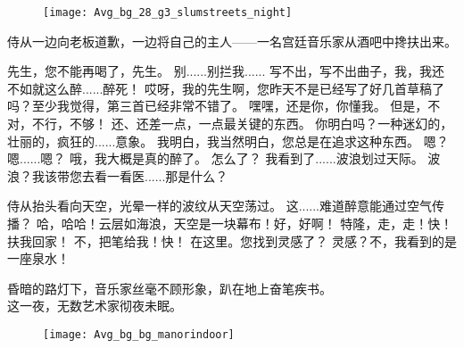 \documentclass[openany]{book}
\begin{document}
\begin{figure}[h]
    \centering
    \texttt{[image: Avg\_bg\_28\_g3\_slumstreets\_night]}
\end{figure}
侍从一边向老板道歉，一边将自己的主人——一名宫廷音乐家从酒吧中搀扶出来。
\begin{dialogue}
     先生，您不能再喝了，先生。
     别......别拦我......
     写不出，写不出曲子，我，我还不如就这么醉......醉死！
     哎呀，我的先生啊，您昨天不是已经写了好几首草稿了吗？至少我觉得，第三首已经非常不错了。
     嘿嘿，还是你，你懂我。
     但是，不对，不行，不够！
     还、还差一点，一点最关键的东西。
     你明白吗？一种迷幻的，壮丽的，疯狂的......意象。
     我明白，我当然明白，您总是在追求这种东西。
     嗯？嗯......嗯？
     哦，我大概是真的醉了。
     怎么了？
     我看到了......波浪划过天际。
     波浪？我该带您去看一看医......那是什么？\par
    侍从抬头看向天空，光晕一样的波纹从天空荡过。
     这......难道醉意能通过空气传播？
     哈，哈哈！云层如海浪，天空是一块幕布！好，好啊！
     特隆，走，走！快！扶我回家！
     不，把笔给我！快！
     在这里。您找到灵感了？
     灵感？不，我看到的是一座泉水！\par
    昏暗的路灯下，音乐家丝毫不顾形象，趴在地上奋笔疾书。\\
    这一夜，无数艺术家彻夜未眠。
\end{dialogue}
\begin{figure}[h]
    \centering
    \texttt{[image: Avg\_bg\_bg\_manorindoor]}
\end{figure}
\end{document}
